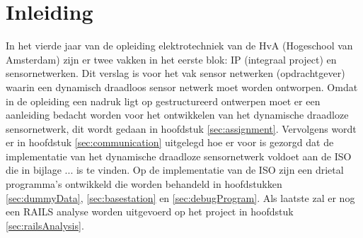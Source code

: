 \section{Inleiding}

In het vierde jaar van de opleiding elektrotechniek van de HvA (Hogeschool van Amsterdam) zijn er twee vakken in het eerste blok: IP (integraal project) en sensornetwerken. Dit verslag is voor het vak sensor netwerken (opdrachtgever) waarin een dynamisch draadloos sensor netwerk moet worden ontworpen. Omdat in de opleiding een nadruk ligt op gestructureerd ontwerpen moet er een aanleiding bedacht worden voor het ontwikkelen van het dynamische draadloze sensornetwerk, dit wordt gedaan in hoofdstuk \ref{sec:assignment}. Vervolgens wordt er in hoofdstuk \ref{sec:communication} uitgelegd hoe er voor is gezorgd dat de implementatie van het dynamische draadloze sensornetwerk voldoet aan de ISO die in bijlage ...  is te vinden. Op de implementatie van de ISO zijn een drietal programma's ontwikkeld die worden behandeld in hoofdstukken \ref{sec:dummyData}, \ref{sec:basestation} en \ref{sec:debugProgram}. Als laatste zal er nog een RAILS analyse worden uitgevoerd op het project in hoofdstuk \ref{sec:railsAnalysis}.